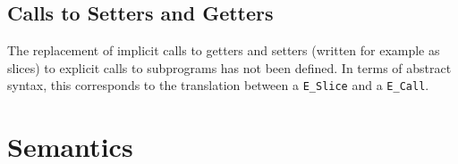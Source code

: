 






\subsection{Calls to Setters and Getters}
The replacement of implicit calls to getters and setters (written for example as
slices) to explicit calls to subprograms has not been defined.
%
In terms of abstract syntax, this corresponds to the translation between a
\texttt{E\_Slice} and a \texttt{E\_Call}.




\section{Semantics}

